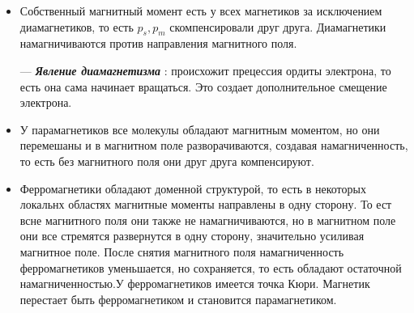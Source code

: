 \documentclass[../main.tex]{subfiles}
\begin{document}
\begin{itemize}
    \item Собственный магнитный момент есть у всех магнетиков за исключением диамагнетиков, то есть $p_s, p_m$ скомпенсировали друг друга. Диамагнетики намагничиваются против направления магнитного поля.

    --- \textit{\textbf{Явление диамагнетизма}} : происхожит прецессия ордиты электрона, то есть она сама начинает вращаться. Это создает дополнительное смещение электрона.

    \item  У парамагнетиков все молекулы обладают магнитным моментом, но они перемешаны и в магнитном поле разворачиваются,
    создавая намагниченность, то есть без магнитного поля они друг друга компенсируют.

    \item Ферромагнетики обладают доменной структурой, то есть в некоторых локальнх областях магнитные моменты направлены в одну сторону. То ест всне магнитного поля они также 
    не намагничиваются, но в магнитном поле они все стремятся развернутся в одну сторону, значительно усиливая магнитное поле.
    После снятия магнитного поля намагниченность ферромагнетиков уменьшается, но сохраняется, то есть обладают остаточной намагниченностью.У ферромагнетиков имеется точка Кюри. Магнетик 
    перестает быть ферромагнетиком и становится парамагнетиком.
    \begin{center}


\end{center}
\end{itemize}
\end{document}
